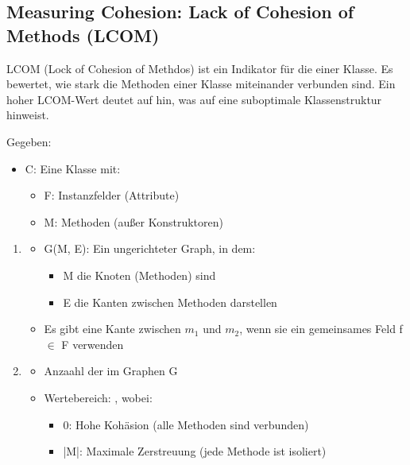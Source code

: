 \subsection{Measuring Cohesion: Lack of Cohesion of Methods (LCOM)}
\begin{infoBox}[title=Was ist LCOM?]
    LCOM (Lock of Cohesion of Methdos) ist ein Indikator für die  einer Klasse. Es bewertet, wie stark die Methoden einer Klasse miteinander verbunden sind. Ein hoher LCOM-Wert deutet auf  hin, was auf eine suboptimale Klassenstruktur hinweist.
\end{infoBox}
\begin{infoBox}[title=Definition (LCOM nach Li \& Henry)]
    Gegeben:
    \begin{itemize}
        \item C: Eine Klasse mit:
        \begin{itemize}
            \item F: Instanzfelder (Attribute)
            \item M: Methoden (außer Konstruktoren)
        \end{itemize}
    \end{itemize}
    \begin{enumerate}
        \item {}
        \begin{itemize}
            \item G(M, E): Ein ungerichteter Graph, in dem:
            \begin{itemize}
                \item M die Knoten (Methoden) sind
                \item E die Kanten zwischen Methoden darstellen
            \end{itemize}
            \item Es gibt eine Kante zwischen $m_{1}$ und $m_{2}$, wenn sie ein gemeinsames Feld f $\in$ F verwenden
        \end{itemize}
        \item {}
        \begin{itemize}
            \item {} Anzaahl der  im Graphen G
            \item Wertebereich: , wobei:
            \begin{itemize}
                \item 0: Hohe Kohäsion (alle Methoden sind verbunden)
                \item |M|: Maximale Zerstreuung (jede Methode ist isoliert)
            \end{itemize}
        \end{itemize}
    \end{enumerate}
\end{infoBox}
